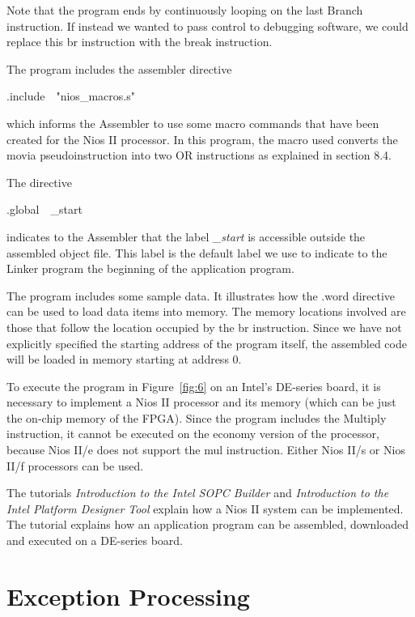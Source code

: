 \documentclass[11pt, twoside, pdftex]{article}
\begin{document}
\noindent
Note that the program ends by continuously
looping on the last Branch instruction. If instead we wanted to pass control to
debugging software, we could replace this {\sf br} instruction with the {\sf break}
instruction.
  

The program includes the assembler directive
\begin{center}
{\sf .include~~"nios\_macros.s"}
\end{center}
\noindent
which informs the Assembler to use some macro commands that have been created
for the Nios II processor. In this program, the macro used
converts the {\sf movia} pseudoinstruction into two OR instructions as
explained in section 8.4.
 

The directive
\begin{center}
{\sf .global~~\_start}
\end{center} 
\noindent
indicates to the Assembler that the label {\it \_start} is accessible outside the
assembled object file. This label is the default label we use to indicate to
the Linker program the beginning of the application program.
 

The program includes some sample data. It illustrates how the {\sf .word} directive 
can be used to load data items into memory. The memory locations involved are those
that follow the location occupied by the {\sf br} instruction. 
Since we have not explicitly specified the starting address of the 
program itself, the assembled code will be loaded in memory starting 
at address 0.

To execute the program in Figure~\ref{fig:6} on an Intel's DE-series board, it is necessary to 
implement a Nios II processor and its memory (which can be just the on-chip memory of 
the FPGA). Since the program includes the Multiply instruction, it cannot
be executed on the economy version of the processor, because Nios II/e does not
support the {\sf mul} instruction. Either Nios II/s or Nios II/f processors can
be used.
 

The tutorials {\it Introduction to the Intel SOPC Builder} and 
{\it Introduction to the Intel Platform Designer Tool} explain
how a Nios II system can be implemented.
The tutorial {\it \productNameMed{}} explains how an application program can be
assembled, downloaded and executed on a DE-series board.

\section{Exception Processing}
\end{document}
